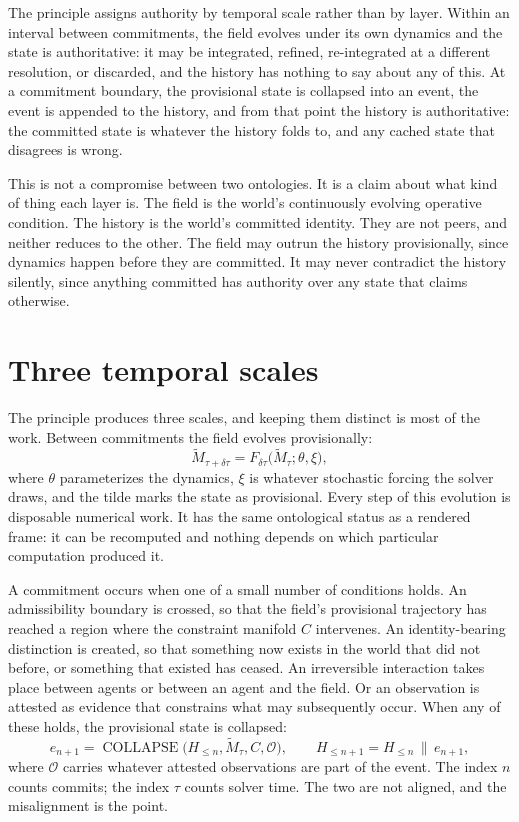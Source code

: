 \documentclass[11pt]{article}
\DeclareMathOperator{\COLLAPSE}{COLLAPSE}
\begin{document}
\begin{center}
\end{center}

The principle assigns authority by temporal scale rather than by layer. Within an interval between commitments, the field evolves under its own dynamics and the state is authoritative: it may be integrated, refined, re-integrated at a different resolution, or discarded, and the history has nothing to say about any of this. At a commitment boundary, the provisional state is collapsed into an event, the event is appended to the history, and from that point the history is authoritative: the committed state is whatever the history folds to, and any cached state that disagrees is wrong.

This is not a compromise between two ontologies. It is a claim about what kind of thing each layer is. The field is the world's continuously evolving operative condition. The history is the world's committed identity. They are not peers, and neither reduces to the other. The field may outrun the history provisionally, since dynamics happen before they are committed. It may never contradict the history silently, since anything committed has authority over any state that claims otherwise.

\section{Three temporal scales}

The principle produces three scales, and keeping them distinct is most of the work. Between commitments the field evolves provisionally:
\[
\widetilde M_{\tau+\delta\tau} = F_{\delta\tau}\bigl(\widetilde M_\tau;\theta,\xi\bigr),
\]
where $\theta$ parameterizes the dynamics, $\xi$ is whatever stochastic forcing the solver draws, and the tilde marks the state as provisional. Every step of this evolution is disposable numerical work. It has the same ontological status as a rendered frame: it can be recomputed and nothing depends on which particular computation produced it.

A commitment occurs when one of a small number of conditions holds. An admissibility boundary is crossed, so that the field's provisional trajectory has reached a region where the constraint manifold $C$ intervenes. An identity-bearing distinction is created, so that something now exists in the world that did not before, or something that existed has ceased. An irreversible interaction takes place between agents or between an agent and the field. Or an observation is attested as evidence that constrains what may subsequently occur. When any of these holds, the provisional state is collapsed:
\[
e_{n+1} = \COLLAPSE\bigl(H_{\leq n}, \widetilde M_\tau, C, \mathcal O\bigr), \qquad
H_{\leq n+1} = H_{\leq n} \,\|\, e_{n+1},
\]
where $\mathcal O$ carries whatever attested observations are part of the event. The index $n$ counts commits; the index $\tau$ counts solver time. The two are not aligned, and the misalignment is the point.
\end{document}
